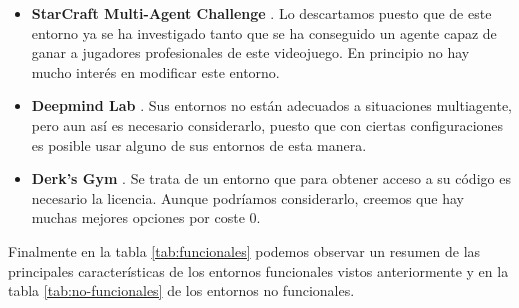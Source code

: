\begin{itemize}
	\item \textbf{StarCraft Multi-Agent Challenge} \cite {starcraft-repo}. Lo descartamos puesto que de este entorno ya se ha investigado tanto que se ha conseguido un agente capaz de ganar a jugadores profesionales de este videojuego. En principio no hay mucho interés en modificar este entorno.

	\item \textbf{Deepmind Lab} \cite{deepmind-repo}. Sus entornos no están adecuados a situaciones multiagente, pero aun así es necesario considerarlo, puesto que con ciertas configuraciones es posible usar alguno de sus entornos de esta manera.

	\item \textbf{Derk's Gym} \cite{derk-repo}. Se trata de un entorno que para obtener acceso a su código es necesario la licencia. Aunque podríamos considerarlo, creemos que hay muchas mejores opciones por coste 0.

\end{itemize}

Finalmente en la tabla \ref{tab:funcionales} podemos observar un resumen de las principales características de los entornos funcionales vistos anteriormente y en la tabla \ref{tab:no-funcionales} de los entornos no funcionales.

